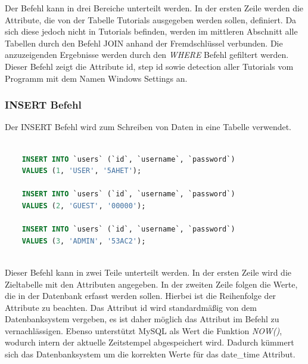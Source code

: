 Der Befehl kann in drei Bereiche unterteilt werden. In der ersten Zeile werden die
Attribute, die von der Tabelle Tutorials ausgegeben werden sollen, definiert. Da sich diese jedoch nicht in Tutorials befinden, werden im mittleren Abschnitt alle Tabellen durch den Befehl JOIN anhand der Fremdschlüssel verbunden. Die anzuzeigenden Ergebnisse werden durch den \textit{WHERE} Befehl gefiltert werden. Dieser Befehl zeigt die Attribute id, step id sowie detection aller Tutorials vom Programm mit dem Namen Windows Settings an.

\subsubsection{INSERT Befehl}

Der INSERT Befehl wird zum Schreiben von Daten in eine Tabelle verwendet.

\begin{lstlisting}[language=SQL, caption={Einfügen der Benutzer und Passwörter über den},captionpos=b]
	
	INSERT INTO `users` (`id`, `username`, `password`)
	VALUES (1, 'USER', '5AHET');
	
	INSERT INTO `users` (`id`, `username`, `password`)
	VALUES (2, 'GUEST', '00000');
	
	INSERT INTO `users` (`id`, `username`, `password`)
	VALUES (3, 'ADMIN', '53AC2');
	
\end{lstlisting}

Dieser Befehl kann in zwei Teile unterteilt werden. In der ersten Zeile wird die
Zieltabelle mit den Attributen angegeben. In der zweiten Zeile folgen die Werte, die in der Datenbank erfasst werden sollen. Hierbei ist die Reihenfolge der Attribute zu beachten. Das Attribut id wird standardmäßig von dem Datenbanksystem vergeben, es ist daher möglich das Attribut im Befehl zu vernachlässigen. Ebenso unterstützt MySQL als Wert die Funktion \textit{NOW()}, wodurch intern der aktuelle Zeitstempel abgespeichert wird. Dadurch kümmert sich das Datenbanksystem um die korrekten Werte für das date\_time Attribut.

\newpage